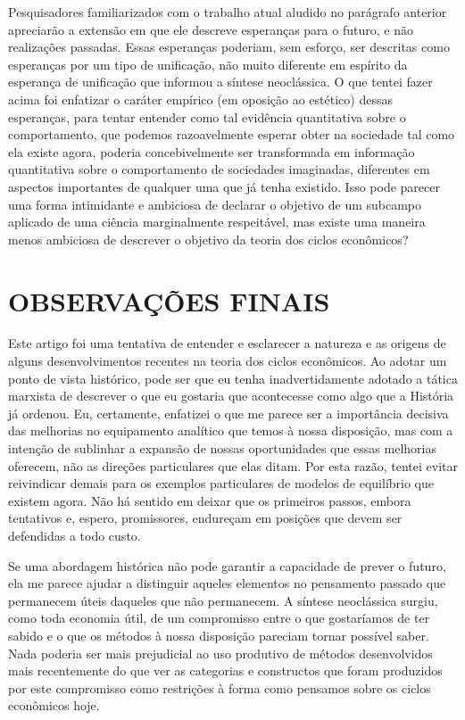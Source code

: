 \documentclass[12pt]{article}
\begin{document}
Pesquisadores familiarizados com o trabalho atual aludido no parágrafo anterior apreciarão a extensão em que ele descreve esperanças para o futuro, e não realizações passadas. Essas esperanças poderiam, sem esforço, ser descritas como esperanças por um tipo de unificação, não muito diferente em espírito da esperança de unificação que informou a síntese neoclássica. O que tentei fazer acima foi enfatizar o caráter empírico (em oposição ao estético) dessas esperanças, para tentar entender como tal evidência quantitativa sobre o comportamento, que podemos razoavelmente esperar obter na sociedade tal como ela existe agora, poderia concebivelmente ser transformada em informação quantitativa sobre o comportamento de sociedades imaginadas, diferentes em aspectos importantes de qualquer uma que já tenha existido. Isso pode parecer uma forma intimidante e ambiciosa de declarar o objetivo de um subcampo aplicado de uma ciência marginalmente respeitável, mas existe uma maneira menos ambiciosa de descrever o objetivo da teoria dos ciclos econômicos?

\section{OBSERVAÇÕES FINAIS}

Este artigo foi uma tentativa de entender e esclarecer a natureza e as origens de alguns desenvolvimentos recentes na teoria dos ciclos econômicos. Ao adotar um ponto de vista histórico, pode ser que eu tenha inadvertidamente adotado a tática marxista de descrever o que eu gostaria que acontecesse como algo que a História já ordenou. Eu, certamente, enfatizei o que me parece ser a importância decisiva das melhorias no equipamento analítico que temos à nossa disposição, mas com a intenção de sublinhar a expansão de nossas oportunidades que essas melhorias oferecem, não as direções particulares que elas ditam. Por esta razão, tentei evitar reivindicar demais para os exemplos particulares de modelos de equilíbrio que existem agora. Não há sentido em deixar que os primeiros passos, embora tentativos e, espero, promissores, endureçam em posições que devem ser defendidas a todo custo.

Se uma abordagem histórica não pode garantir a capacidade de prever o futuro, ela me parece ajudar a distinguir aqueles elementos no pensamento passado que permanecem úteis daqueles que não permanecem. A síntese neoclássica surgiu, como toda economia útil, de um compromisso entre o que gostaríamos de ter sabido e o que os métodos à nossa disposição pareciam tornar possível saber. Nada poderia ser mais prejudicial ao uso produtivo de métodos desenvolvidos mais recentemente do que ver as categorias e constructos que foram produzidos por este compromisso como restrições à forma como pensamos sobre os ciclos econômicos hoje.
\end{document}
